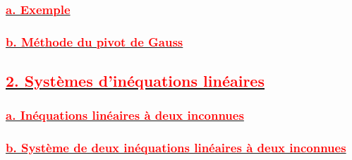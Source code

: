 \documentclass[12pt]{article}
\begin{document}
\subsubsection*{\underline{\textbf{\textcolor{red}{a. Exemple}}}}
\subsubsection*{\underline{\textbf{\textcolor{red}{b. Méthode du pivot de Gauss }}}}
\subsection*{\underline{\textbf{\textcolor{red}{2. Systèmes d’inéquations linéaires }}}}
\subsubsection*{\underline{\textbf{\textcolor{red}{a. Inéquations linéaires à deux inconnues}}}}
\subsubsection*{\underline{\textbf{\textcolor{red}{b. Système de deux inéquations linéaires à deux inconnues }}}}
\end{document}
